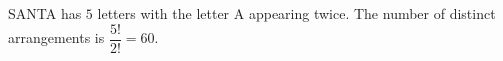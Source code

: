 SANTA has $5$ letters with the letter A appearing twice. The number of distinct arrangements is $\dfrac{5!}{2!}=\boxed{60}$.
